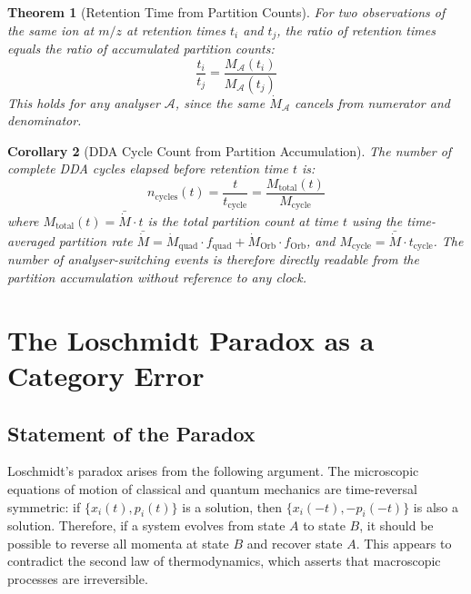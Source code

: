 \documentclass[11pt,twocolumn,a4paper]{article}
\theoremstyle{plain}
\newtheorem{theorem}{Theorem}[section]
\newtheorem{corollary}[theorem]{Corollary}
\theoremstyle{definition}
\theoremstyle{remark}
\begin{document}
\begin{theorem}[Retention Time from Partition Counts]
\label{thm:rt_from_partition}
For two observations of the same ion at $m/z$ at retention times $t_i$ and
$t_j$, the ratio of retention times equals the ratio of accumulated partition
counts:
\begin{equation}
    \frac{t_i}{t_j} = \frac{M_{\mathcal{A}}(t_i)}{M_{\mathcal{A}}(t_j)}
    \label{eq:rt_ratio}
\end{equation}
This holds for any analyser $\mathcal{A}$, since the same $\dot{M}_{\mathcal{A}}$
cancels from numerator and denominator.
\end{theorem}

\begin{corollary}[DDA Cycle Count from Partition Accumulation]
\label{cor:dda_cycles}
The number of complete DDA cycles elapsed before retention time $t$ is:
\begin{equation}
    n_{\mathrm{cycles}}(t) = \frac{t}{t_{\mathrm{cycle}}} =
    \frac{M_{\mathrm{total}}(t)}{M_{\mathrm{cycle}}}
    \label{eq:dda_cycles}
\end{equation}
where $M_{\mathrm{total}}(t) = \bar{\dot{M}} \cdot t$ is the total partition
count at time $t$ using the time-averaged partition rate $\bar{\dot{M}} =
\dot{M}_{\mathrm{quad}} \cdot f_{\mathrm{quad}} + \dot{M}_{\mathrm{Orb}} \cdot
f_{\mathrm{Orb}}$, and $M_{\mathrm{cycle}} = \bar{\dot{M}} \cdot t_{\mathrm{cycle}}$.
The number of analyser-switching events is therefore directly readable from the
partition accumulation without reference to any clock.
\end{corollary}


\section{The Loschmidt Paradox as a Category Error}
\label{sec:loschmidt}

\subsection{Statement of the Paradox}
\label{subsec:paradox_statement}

Loschmidt's paradox arises from the following argument. The microscopic equations
of motion of classical and quantum mechanics are time-reversal symmetric: if
$\{x_i(t), p_i(t)\}$ is a solution, then $\{x_i(-t), -p_i(-t)\}$ is also a
solution. Therefore, if a system evolves from state $A$ to state $B$, it should
be possible to reverse all momenta at state $B$ and recover state $A$. This
appears to contradict the second law of thermodynamics, which asserts that
macroscopic processes are irreversible.
\end{document}
